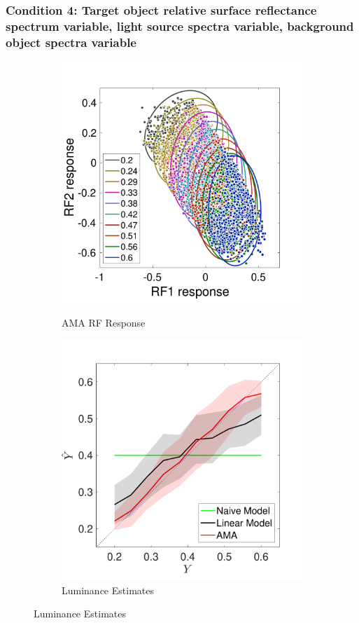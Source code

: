 \documentclass{jov}
\begin{document}
\subsubsection{Condition 4: Target object relative surface reflectance spectrum variable, light source spectra variable, background object spectra variable}
\begin{figure}
\centering
    \begin{subfigure}[b]{0.3 \textwidth}   
        \caption{AMA RF Response}
        \includegraphics[width=\textwidth]{../Figures/Figure13/Figure13_a.pdf}
        \label{fig:case12FiltersResponse}
    \end{subfigure}    
        \begin{subfigure}[b]{0.3 \textwidth}
        \caption{Luminance Estimates}
        \includegraphics[width=\textwidth]{../Figures/Figure13/Figure13_b.pdf}

\end{subfigure}
\end{figure}
\end{document}
